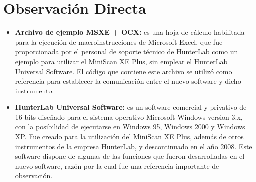 	\section{Observaci\'{o}n Directa}
		\begin{itemize}
		
			\item \textbf{Archivo de ejemplo MSXE + OCX:} es una hoja de c\'{a}lculo habilitada para la ejecuci\'{o}n de macroinstrucciones de Microsoft Excel, que fue proporcionada por el personal de soporte t\'{e}cnico de HunterLab como un ejemplo para utilizar el MiniScan XE Plus, sin emplear el HunterLab Universal Software. El c\'{o}digo que contiene este archivo se utiliz\'{o} como referencia para establecer la comunicaci\'{o}n entre el nuevo software y dicho instrumento.

			
			\item \textbf{HunterLab Universal Software:} es un software comercial y privativo de 16 bits dise\~{n}ado para el sistema operativo Microsoft Windows version 3.x, con la posibilidad de ejecutarse en Windows 95, Windows 2000 y Windows XP. Fue creado para la utilizaci\'{o}n del MiniScan XE Plus, adem\'{a}s de otros instrumentos de la empresa HunterLab, y descontinuado en el a\~{n}o 2008. Este software dispone de algunas de las funciones que fueron desarrolladas en el nuevo software, raz\'{o}n por la cual fue una referencia importante de observaci\'{o}n.

		\end{itemize}
